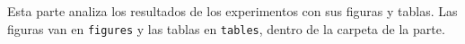 
Esta parte analiza los resultados de los experimentos con sus figuras y tablas.
Las figuras van en \texttt{figures} y las tablas en \texttt{tables}, dentro de la carpeta de la parte.
